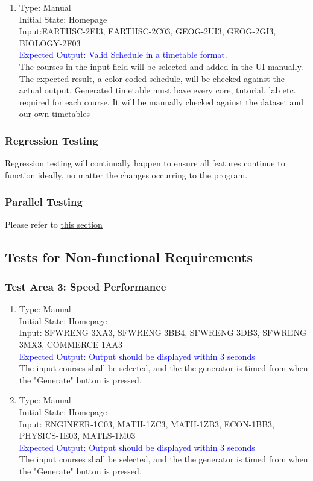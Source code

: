 \documentclass[11pt, oneside]{article}   	%
\begin{document}
\begin{enumerate}
\item Type: Manual \\
Initial State: Homepage \\
Input:EARTHSC-2EI3, EARTHSC-2C03, GEOG-2UI3, GEOG-2GI3, BIOLOGY-2F03\\
\textcolor{blue}{Expected Output: Valid Schedule in a timetable format.} \\
The courses in the input field will be selected and added in the UI manually. The expected result, a color coded schedule, will be checked against the actual output. Generated timetable must have every core, tutorial, lab etc. required for each course. It will be manually checked against the dataset and our own timetables \\
\end{enumerate}

\subsubsection{Regression Testing}
Regression testing will continually happen to ensure all features continue to function ideally, no matter the changes occurring to the program.

\subsubsection{Parallel Testing}
Please refer to \hyperref[sec:compare]{this section}

\subsection{Tests for Non-functional Requirements}
\subsubsection{Test Area 3: Speed Performance}
\begin{enumerate}

\item Type: Manual \\
Initial State: Homepage \\
Input: SFWRENG 3XA3, SFWRENG 3BB4, SFWRENG 3DB3, SFWRENG 3MX3, COMMERCE 1AA3 \\
\textcolor{blue}{Expected Output: Output should be displayed within 3 seconds} \\
The input courses shall be selected, and the the generator is timed from when the "Generate" button is pressed. \\

\item Type: Manual \\
Initial State: Homepage \\
Input:  ENGINEER-1C03, MATH-1ZC3, MATH-1ZB3,  ECON-1BB3, PHYSICS-1E03, MATLS-1M03 \\
\textcolor{blue}{Expected Output: Output should be displayed within 3 seconds} \\
The input courses shall be selected, and the the generator is timed from when the "Generate" button is pressed.  \\
\end{enumerate}
\end{document}

